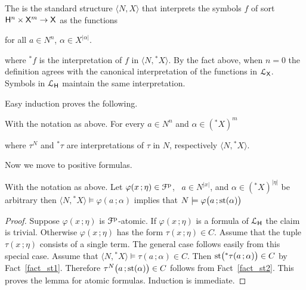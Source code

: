 \documentclass{amsproc}
\renewcommand*{\emph}[1]{%
   \smash{\tikz[baseline]\node[rectangle, fill=teal!25, rounded corners, inner xsep=0.5ex, inner ysep=0.2ex, anchor=base, minimum height = 2.7ex]{\strut #1};}}
\begin{document}
The \emph{standard part of $\langle N,{}^*\!\!X\rangle$\/} is the standard structure $\langle N,X\rangle$ that interprets the symbols $f$ of sort ${\sf H}^n\times{\sf X}^m\to {\sf X}$ as the functions

\hfill for all $a\in N^n$, $\alpha\in X^{|\alpha|}$.

where ${}^*\!\!f$ is the interpretation of $f$ in $\langle N,{}^*\!\!X\rangle$.
By the fact above, when $n=0$ the definition agrees with the canonical interpretation of the functions in ${\EuScript L}_{\sf X}$.
Symbols in ${\EuScript L}_{\sf H}$ maintain the same interpretation.

Easy induction proves the following.

\begin{fact}\label{fact_st2} 
  With the notation as above.
  For every $a\in N^n$ and $\alpha\in ({}^*\!\!X)^m$


  where $\tau^N$ and ${}^*\!\tau$ are interpretations of $\tau$ in $N$, respectively $\langle N,{}^*\!\!X\rangle$.
\end{fact}

Now we move to positive formulas.


\begin{lemma}\label{lem_st}
  With the notation as above.
  Let $\varphi(x\,;\eta)\in{\EuScript F}^{\rm p}$, \  $a\in N^{|x|}$, and $\alpha\in({}^*\!\!X)^{|\eta|}$ be arbitrary then $\langle N,{}^*\!\!X\rangle\models\varphi(a\,;\alpha)$ implies that $N\models\varphi\big(a\,;{\rm st}(\alpha)\big)$
\end{lemma}

\begin{proof}
  Suppose $\varphi(x\,;\eta)$ is ${\EuScript F}^{\rm p}$-atomic.
  If $\varphi(x\,;\eta)$ is a formula of ${\EuScript L}_{\sf H}$ the claim is trivial. 
  Otherwise $\varphi(x\,;\eta)$ has the form $\tau(x\,;\eta)\in C$.
  Assume that the tuple $\tau(x\,;\eta)$ consists of a single term.
  The general case follows easily from this special case. 
  Assume that $\langle N,{}^*\!\!X\rangle\models \tau(a\,;\alpha)\in C$.
  Then ${\rm st}\big({}^*\tau(a\,;\alpha)\big)\in C$ by Fact~\ref{fact_st1}.
  Therefore $\tau^N\big(a\,;{\rm st}(\alpha)\big)\in C$ follows from Fact~\ref{fact_st2}.
  This proves the lemma for atomic formulas.
  Induction is immediate. 
\end{proof}
\end{document}
